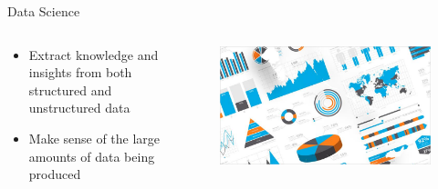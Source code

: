 \documentclass{beamer}
\begin{document}
\begin{frame}{Data Science}
\begin{columns}
	\begin{column}{.45\textwidth}
		\begin{itemize}
			\item Extract knowledge and insights from both structured and unstructured data
			\item Make sense of the large amounts of data being produced
		\end{itemize}
	\end{column}
	\begin{column}{.55\textwidth}
		\begin{figure}
			\includegraphics[width=\linewidth]{img/datascience.png}
		\end{figure}
	\end{column}
\end{columns}
\end{frame}
\end{document}

